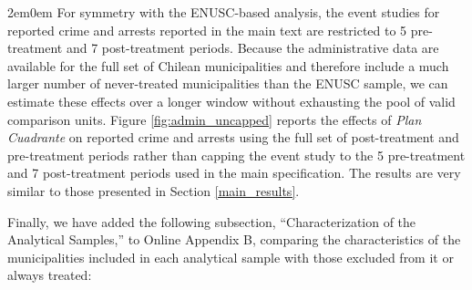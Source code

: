 \begin{adjustwidth}{2em}{0em}
For symmetry with the ENUSC-based analysis, the event studies for reported crime and arrests reported in the main text are restricted to 5 pre-treatment and 7 post-treatment periods. Because the administrative data are available for the full set of Chilean municipalities and therefore include a much larger number of never-treated municipalities than the ENUSC sample, we can estimate these effects over a longer window without exhausting the pool of valid comparison units. Figure \ref{fig:admin_uncapped} reports the effects of \emph{Plan Cuadrante} on reported crime and arrests using the full set of post-treatment and pre-treatment periods rather than capping the event study to the 5 pre-treatment and 7 post-treatment periods used in the main specification. The results are very similar to those presented in Section \ref{main_results}.
\end{adjustwidth}


Finally, we have added the following subsection, ``Characterization of the Analytical Samples,'' to Online Appendix B, comparing the characteristics of the municipalities included in each analytical sample with those excluded from it or always treated:

